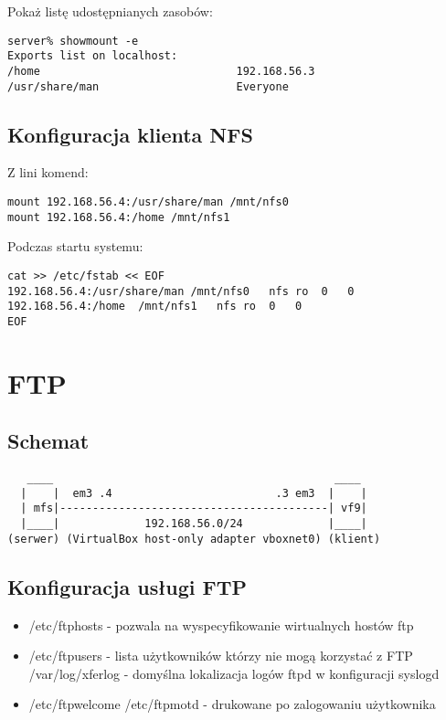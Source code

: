 \documentclass[a4paper,11pt]{article}
\begin{document}
Pokaż listę udostępnianych zasobów:

\begin{verbatim}
server% showmount -e
Exports list on localhost:
/home                              192.168.56.3
/usr/share/man                     Everyone
\end{verbatim}

\subsection{Konfiguracja klienta NFS}
Z lini komend:
\begin{verbatim}
mount 192.168.56.4:/usr/share/man /mnt/nfs0
mount 192.168.56.4:/home /mnt/nfs1
\end{verbatim}
Podczas startu systemu:
\begin{verbatim}
cat >> /etc/fstab << EOF
192.168.56.4:/usr/share/man	/mnt/nfs0	nfs	ro	0	0
192.168.56.4:/home	/mnt/nfs1	nfs	ro	0	0
EOF
\end{verbatim}

\section{FTP}
\subsection{Schemat}
\begin{verbatim}
   ____                                           ____
  |    |  em3 .4                         .3 em3  |    |
  | mfs|-----------------------------------------| vf9|
  |____|             192.168.56.0/24             |____|
(serwer) (VirtualBox host-only adapter vboxnet0) (klient)

\end{verbatim}
\subsection{Konfiguracja usługi FTP}

\begin{itemize}
\item /etc/ftphosts - pozwala na wyspecyfikowanie wirtualnych hostów ftp
\item /etc/ftpusers - lista użytkowników którzy nie mogą korzystać z FTP
/var/log/xferlog - domyślna lokalizacja logów ftpd w konfiguracji syslogd
\item /etc/ftpwelcome /etc/ftpmotd - drukowane po zalogowaniu użytkownika
\end{itemize}
\end{document}
